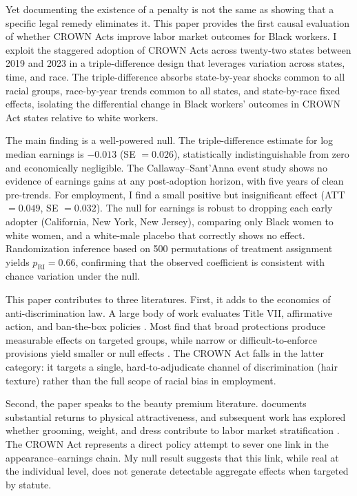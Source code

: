 \documentclass[12pt]{article}
\begin{document}
Yet documenting the existence of a penalty is not the same as showing that a specific legal remedy eliminates it. This paper provides the first causal evaluation of whether CROWN Acts improve labor market outcomes for Black workers. I exploit the staggered adoption of CROWN Acts across twenty-two states between 2019 and 2023 in a triple-difference design that leverages variation across states, time, and race. The triple-difference absorbs state-by-year shocks common to all racial groups, race-by-year trends common to all states, and state-by-race fixed effects, isolating the differential change in Black workers' outcomes in CROWN Act states relative to white workers.

The main finding is a well-powered null. The triple-difference estimate for log median earnings is $-0.013$ (SE $= 0.026$), statistically indistinguishable from zero and economically negligible. The Callaway--Sant'Anna event study shows no evidence of earnings gains at any post-adoption horizon, with five years of clean pre-trends. For employment, I find a small positive but insignificant effect (ATT $= 0.049$, SE $= 0.032$). The null for earnings is robust to dropping each early adopter (California, New York, New Jersey), comparing only Black women to white women, and a white-male placebo that correctly shows no effect. Randomization inference based on 500 permutations of treatment assignment yields $p_{\text{RI}} = 0.66$, confirming that the observed coefficient is consistent with chance variation under the null.

This paper contributes to three literatures. First, it adds to the economics of anti-discrimination law. A large body of work evaluates Title VII, affirmative action, and ban-the-box policies \citep{donohue_heckman_1991, heckman_payner_1989, autor_2003, doleac_hansen_2020}. Most find that broad protections produce measurable effects on targeted groups, while narrow or difficult-to-enforce provisions yield smaller or null effects \citep{neumark_2018}. The CROWN Act falls in the latter category: it targets a single, hard-to-adjudicate channel of discrimination (hair texture) rather than the full scope of racial bias in employment.

Second, the paper speaks to the beauty premium literature. \citet{hamermesh_2011} documents substantial returns to physical attractiveness, and subsequent work has explored whether grooming, weight, and dress contribute to labor market stratification \citep{mobius_rosenblat_2006}. The CROWN Act represents a direct policy attempt to sever one link in the appearance--earnings chain. My null result suggests that this link, while real at the individual level, does not generate detectable aggregate effects when targeted by statute.
\end{document}
